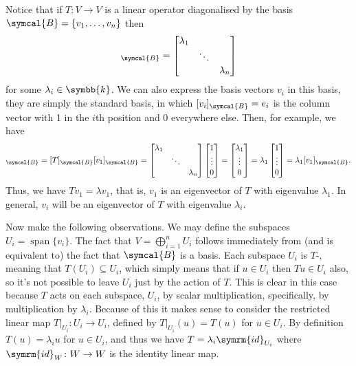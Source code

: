 \documentclass[fleqn]{NotesClass}
\renewcommand{\field}{\symbb{k}}
\DeclareMathOperator{\Span}{span}
\newcommand{\id}{\symrm{id}}
\newcommand{\basis}{\symcal{B}}
\begin{document}
    Notice that if \(T \colon V \to V\) is a linear operator diagonalised by the basis \(\basis = \{v_1, \dotsc, v_n\}\) then
    \begin{equation}
        [T]_{\basis} = 
        \begin{bmatrix}
            \lambda_1 & & \\
            & \ddots & \\
            & & \lambda_n
        \end{bmatrix}
    \end{equation} 
    for some \(\lambda_i \in \field\).
    We can also express the basis vectors \(v_i\) in this basis, they are simply the standard basis, in which \([v_i]_{\basis} = e_i\) is the column vector with 1 in the \(i\)th position and 0 everywhere else.
    Then, for example, we have
    \begin{equation}
        [Tv_1]_{\basis} = [T]_{\basis}[v_1]_{\basis} = 
        \begin{bmatrix}
            \lambda_1 & & \\
            & \ddots & \\
            & & \lambda_n
        \end{bmatrix}
        \begin{bmatrix}
            1\\ \vdots\\ 0
        \end{bmatrix}
        =
        \begin{bmatrix}
            \lambda_1\\ \vdots\\ 0
        \end{bmatrix}
        = \lambda_1
        \begin{bmatrix}
            1\\ \vdots\\ 0
        \end{bmatrix}
        = \lambda_1 [v_1]_{\basis}.
    \end{equation}
    Thus, we have \(Tv_1 = \lambda v_1\), that is, \(v_1\) is an eigenvector of \(T\) with eigenvalue \(\lambda_1\).
    In general, \(v_i\) will be an eigenvector of \(T\) with eigenvalue \(\lambda_i\).
    
    Now make the following observations.
    We may define the subspaces \(U_i = \Span\{v_i\}\).
    The fact that \(V = \bigoplus_{i=1}^n U_i\) follows immediately from (and is equivalent to) the fact that \(\basis\) is a basis.
    Each subspace \(U_i\) is \(T\)-, meaning that \(T(U_i) \subseteq U_i\), which simply means that if \(u \in U_i\) then \(Tu \in U_i\) also, so it's not possible to leave \(U_i\) just by the action of \(T\).
    This is clear in this case because \(T\) acts on each subspace, \(U_i\), by scalar multiplication, specifically, by multiplication by \(\lambda_i\).
    Because of this it makes sense to consider the restricted linear map \(T|_{U_i} \colon U_i \to U_i\), defined by \(T|_{U_i}(u) = T(u)\) for \(u \in U_i\).
    By definition \(T(u) = \lambda_i u\) for \(u \in U_i\), and thus we have \(T = \lambda_i \id_{U_i}\) where \(\id_W \colon W \to W\) is the identity linear map.
    
\end{document}

